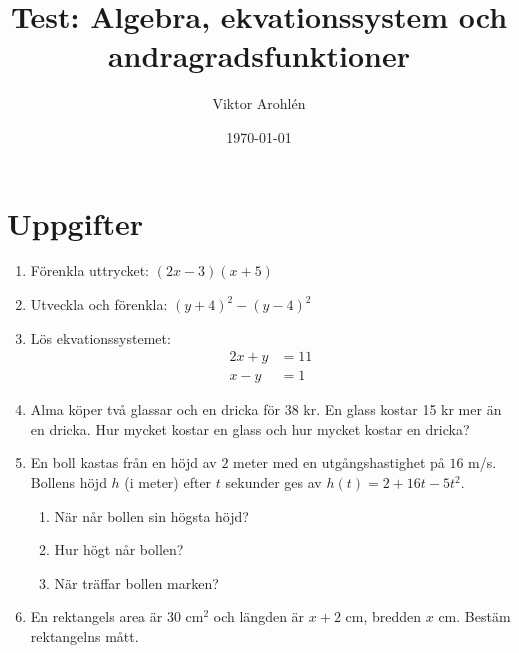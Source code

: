 \documentclass[a4paper,11pt]{article}
\title{Test: Algebra, ekvationssystem och andragradsfunktioner}
\author{Viktor Arohlén}
\date{\today}
\begin{document}
\maketitle

\section*{Uppgifter}
\begin{enumerate}[label=\textbf{\arabic*.}]
    \item Förenkla uttrycket: $(2x - 3)(x + 5)$

    \item Utveckla och förenkla: $(y + 4)^2 - (y - 4)^2$

    \item Lös ekvationssystemet:
    \begin{align*}
    2x + y &= 11 \\
    x - y &= 1
    \end{align*}

    \item Alma köper två glassar och en dricka för 38 kr. En glass kostar 15 kr mer än en dricka. Hur mycket kostar en glass och hur mycket kostar en dricka?

    \item En boll kastas från en höjd av $2$ meter med en utgångshastighet på $16$ m/s. Bollens höjd $h$ (i meter) efter $t$ sekunder ges av $h(t) = 2 + 16t - 5t^2$.
    \begin{enumerate}[label=\alph*)]
        \item När når bollen sin högsta höjd?
        \item Hur högt når bollen?
        \item När träffar bollen marken?
    \end{enumerate}

    \item En rektangels area är $30$ cm$^2$ och längden är $x+2$ cm, bredden $x$ cm. Bestäm rektangelns mått.

\end{enumerate}

\newpage
\end{document}
